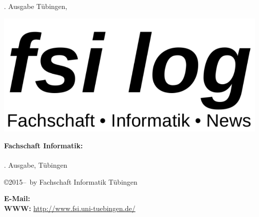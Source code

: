 \thispagestyle{empty}
{\sf \number\auflage. Ausgabe \hfill Tübingen, 
\Month\space \number\jahr}\\
\vspace{5cm}

\includegraphics[width=\textwidth]{logos/fsi-log-logo}


\begin{center}
%
%
%
%
\vfill
\end{center}
\eject

\thispagestyle{empty}

\textbf{Fachschaft Informatik:}\\
\nameit\\
\number\auflage. Ausgabe, Tübingen \number\jahr\\[1cm]

\vfill

\copyright 2015--\number\jahr ~by Fachschaft Informatik Tübingen\\

\medskip

\textbf{E-Mail:} \hfill
{}\\
\textbf{WWW:} \hfill
\url{http://www.fsi.uni-tuebingen.de/}
\newpage
